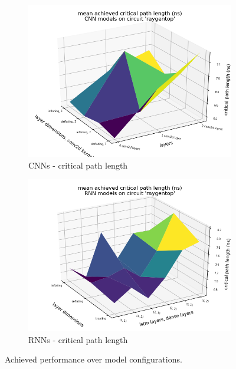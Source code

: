 \begin{figure}
\begin{subfigure}[b]{0.45\linewidth}
		\includegraphics[width=\linewidth]{plots/cnn-hyperopt-critical-path.png}
		\caption{\glspl{CNN} - critical path length}
	\end{subfigure}
	\begin{subfigure}[b]{0.45\linewidth}
		\includegraphics[width=\linewidth]{plots/rnn-hyperopt-critical-path.png}
		\caption{\glspl{RNN} - critical path length}
	\end{subfigure}
	\caption{Achieved performance over model configurations.}
	\label{fig:eval-hyperopt-surface}
\end{figure}

